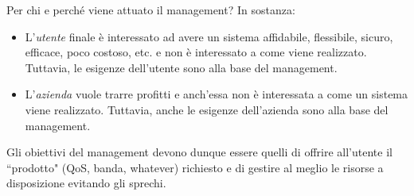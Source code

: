 \noindent Per chi e perché viene attuato il management? In sostanza:
\begin{itemize}
	\item L'\textit{utente} finale è interessato ad avere un sistema affidabile, flessibile, sicuro, efficace, poco costoso, etc. e non è interessato a come viene realizzato. Tuttavia, le esigenze dell'utente sono alla base del management.
	\item L'\textit{azienda} vuole trarre profitti e anch'essa non è interessata a come un sistema viene realizzato. Tuttavia, anche le esigenze dell'azienda sono alla base del management.
\end{itemize}
Gli obiettivi del management devono dunque essere quelli di offrire all'utente il \textquotedblleft prodotto" (QoS, banda, whatever) richiesto e di gestire al meglio le risorse a disposizione evitando gli sprechi.

